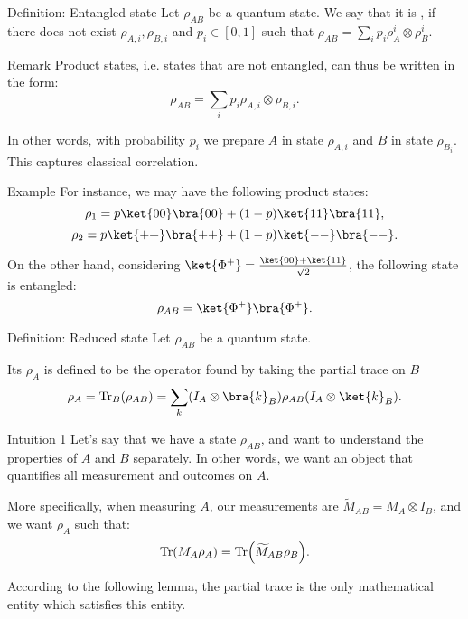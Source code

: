 \documentclass[a4paper]{article}
\begin{document}
\begin{parag}{Definition: Entangled state}
    Let $\rho_{AB}$ be a quantum state. We say that it is , if there does not exist $\rho_{A,i}, \rho_{B,i}$ and $p_i \in \left[0,1\right]$ such that $\rho_{AB} = \sum_{i} p_i \rho_A^i \otimes \rho_B^i$.

    \begin{subparag}{Remark}
        Product states, i.e. states that are not entangled, can thus be written in the form:
        \[\rho_{AB} = \sum_{i} p_i \rho_{A,i} \otimes \rho_{B,i}.\]

        In other words, with probability $p_i$ we prepare $A$ in state $\rho_{A,i}$ and $B$ in state $\rho_{B_i}$. This captures classical correlation.
    \end{subparag}
    
    \begin{subparag}{Example}
        For instance, we may have the following product states: 
        \[\rho_1 = p \ket{00} \bra{00} + \left(1-p\right) \ket{11}\bra{11},\]
        \[\rho_2 = p \ket{++}\bra{++} + \left(1-p\right) \ket{--}\bra{--}.\]

        On the other hand, considering $\ket{\Phi^+} = \frac{\ket{00} + \ket{11}}{\sqrt{2}}$, the following state is entangled: 
        \[\rho_{AB} = \ket{\Phi^+} \bra{\Phi^+}.\]
    \end{subparag}
\end{parag}

\begin{parag}{Definition: Reduced state}
    Let $\rho_{AB}$ be a quantum state. 

    Its  $\rho_A$ is defined to be the operator found by taking the partial trace on $B$
    \[\rho_A = \Tr_B\left(\rho_{AB}\right) = \sum_{k} \left(I_A \otimes \bra{k}_B\right) \rho_{AB} \left(I_A \otimes \ket{k}_B\right).\]

    \begin{subparag}{Intuition 1}
        Let's say that we have a state $\rho_{AB}$, and want to understand the properties of $A$ and $B$ separately. In other words, we want an object that quantifies all measurement and outcomes on $A$.

        More specifically, when measuring $A$, our measurements are $\widetilde{M}_{AB} = M_A \otimes I_B$, and we want $\rho_A$ such that: 
        \[\Tr\left(M_A \rho_A\right) = \Tr\left(\widetilde{M}_{AB} \rho_B\right).\]

        According to the following lemma, the partial trace is the only mathematical entity which satisfies this entity.
    \end{subparag}
\end{parag}
\end{document}
